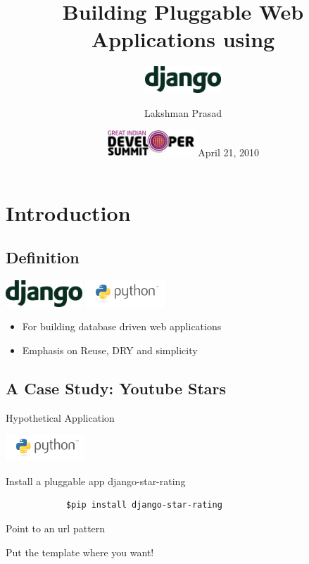 \documentclass[19.9pt]{beamer}
\title{Building Pluggable Web Applications using
}
\institute{Agiliq Solutions}
\subtitle{\includegraphics[height=1cm]{images/django.png}}
\author{Lakshman Prasad}
\date{
	\includegraphics[height=1cm]{images/GIDS_Logo.jpg}\linebreak
	April 21, 2010}
\begin{document}
\begin{frame}
	\titlepage
\end{frame}

\section{Introduction}
	\subsection{Definition}
		\begin{frame}
			{\includegraphics[height=1cm]{images/django.png}\linebreak
				\includegraphics[height=1cm]{images/python-logo.png}}
		\begin{itemize}                                                 				\item
			For building \alert{database driven} web applications                 \pause \item
			Emphasis on Reuse, DRY and simplicity
		\end{itemize}
		\end{frame}
	\subsection{A Case Study: Youtube Stars}
		\begin{frame}
			{Hypothetical Application}
			\begin{center}
				\includegraphics[height=1cm]{images/python-logo.png}
			\end{center}		
		\end{frame}
		\begin{frame}[fragile]
			{Install a pluggable app \alert{django-star-rating} }
			\begin{verbatim}			
			$pip install django-star-rating
			\end{verbatim}
			\lstset{language=python}			
				 
		\end{frame}
		\begin{frame}
			{Point to an url pattern}
			\lstset{language=python}			
				 
		\end{frame}
		\begin{frame}
			{Put the template where you want!}
			\lstset{language=html}			
				 			
		\end{frame}
	\begin{frame}
	  \tableofcontents
	 \end{frame}
\end{document}
